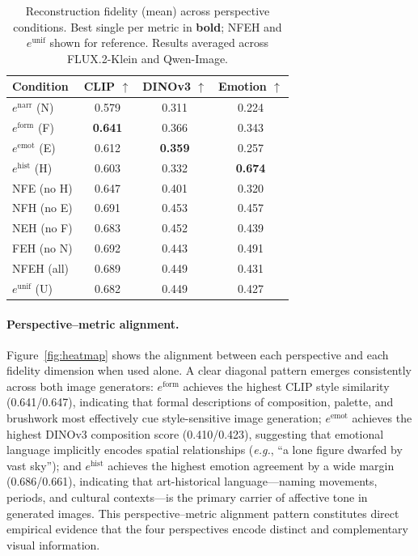 \begin{table}[h]
\centering
\caption{Reconstruction fidelity (mean) across perspective conditions. Best single per metric in \textbf{bold}; NFEH and $e^{\text{unif}}$ shown for reference. Results averaged across FLUX.2-Klein and Qwen-Image.}
\label{tab:complementarity}
\setlength{\tabcolsep}{5pt}
\begin{tabular}{lccc}
\toprule
\textbf{Condition} & \textbf{CLIP} $\uparrow$ & \textbf{DINOv3} $\uparrow$ & \textbf{Emotion} $\uparrow$ \\
\midrule
$e^{\text{narr}}$ (N)  & 0.579 & 0.311 & 0.224 \\
$e^{\text{form}}$ (F)  & \textbf{0.641} & 0.366 & 0.343 \\
$e^{\text{emot}}$ (E)  & 0.612 & \textbf{0.359} & 0.257 \\
$e^{\text{hist}}$ (H)  & 0.603 & 0.332 & \textbf{0.674} \\
\midrule
NFE (no H) & 0.647 & 0.401 & 0.320 \\
NFH (no E) & 0.691 & 0.453 & 0.457 \\
NEH (no F) & 0.683 & 0.452 & 0.439 \\
FEH (no N) & 0.692 & 0.443 & 0.491 \\
\midrule
NFEH (all)              & 0.689 & 0.449 & 0.431 \\
$e^{\text{unif}}$ (U)   & 0.682 & 0.449 & 0.427 \\
\bottomrule
\end{tabular}
\end{table}

\paragraph{Perspective--metric alignment.}
Figure~\ref{fig:heatmap} shows the alignment between each perspective and each fidelity dimension when used alone.
A clear diagonal pattern emerges consistently across both image generators: $e^{\text{form}}$ achieves the highest CLIP style similarity (0.641/0.647), indicating that formal descriptions of composition, palette, and brushwork most effectively cue style-sensitive image generation; $e^{\text{emot}}$ achieves the highest DINOv3 composition score (0.410/0.423), suggesting that emotional language implicitly encodes spatial relationships (\emph{e.g.}, ``a lone figure dwarfed by vast sky''); and $e^{\text{hist}}$ achieves the highest emotion agreement by a wide margin (0.686/0.661), indicating that art-historical language---naming movements, periods, and cultural contexts---is the primary carrier of affective tone in generated images.
This perspective--metric alignment pattern constitutes direct empirical evidence that the four perspectives encode distinct and complementary visual information.

